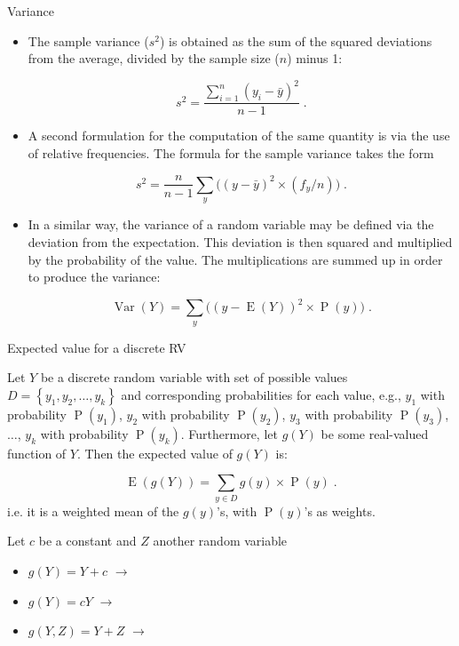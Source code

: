 \documentclass[10pt,handout]{beamer}\usepackage[]{graphicx}\usepackage[]{color}
\newcommand{\Var}{\operatorname{Var}}
\newcommand{\Expec}{\operatorname{E}}
\newcommand{\Prob}{\operatorname{P}}
\begin{document}
\begin{frame}[fragile]{Variance}
	\small
	\begin{itemize}		
		
		\item The sample variance ($s^2$) is obtained as the sum of the squared
		deviations from the average, divided by the sample size ($n$) minus 1:
		
		$$s^2 = \frac{\sum_{i=1}^n (y_i - \bar y)^2}{n-1}\;.$$ 
		
		\item  A second	formulation for the computation of the same quantity is via the use of
		relative frequencies. The formula for the sample variance takes the form
		
		$$s^2 = \frac{n}{n-1}\sum_y \big((y - \bar y)^2\times (f_y/n)\big)\;.$$
		
		
		\item In a similar way, the variance of a random variable may be defined via
		the deviation from the expectation. This deviation is
		then squared and multiplied by the probability of the value. The
		multiplications are summed up in order to produce the variance:
		
		$$\Var(Y) = \sum_y\big( (y-\Expec(Y))^2 \times \Prob(y)\big)\;.$$
		
	\end{itemize}
	
\end{frame}


\begin{frame}{Expected value for a discrete RV}
	
	\begin{definition}
		Let $Y$ be a discrete random variable with set of possible values $D=\left\lbrace y_1, y_2, \ldots,y_k  \right\rbrace$ and corresponding probabilities for each value, e.g., $y_1$ with probability $\Prob(y_1)$, $y_2$ with probability $\Prob(y_2)$, $y_3$ with probability $\Prob(y_3)$, $\ldots$, $y_k$ with probability $\Prob(y_k)$. Furthermore, let $g(Y)$ be some real-valued function of $Y$. Then the expected value of $g(Y)$ is:
		
		$$\operatorname{E}(g(Y)) =  \sum_{y \in D} g(y) \times \operatorname{P}(y)\;.$$
		i.e. it is a weighted mean of the $g(y)$'s, with $\Prob(y)$'s as weights.
	\end{definition}
	\pause 
	Let $c$ be a constant and $Z$ another random variable
	\begin{itemize}
		\item $g(Y) = Y + c$ $\rightarrow$  
		\item $g(Y) = cY$ $\rightarrow$ 
		\item $g(Y,Z) = Y + Z$ $\rightarrow$ 
	\end{itemize}
	
\end{frame}
\end{document}
